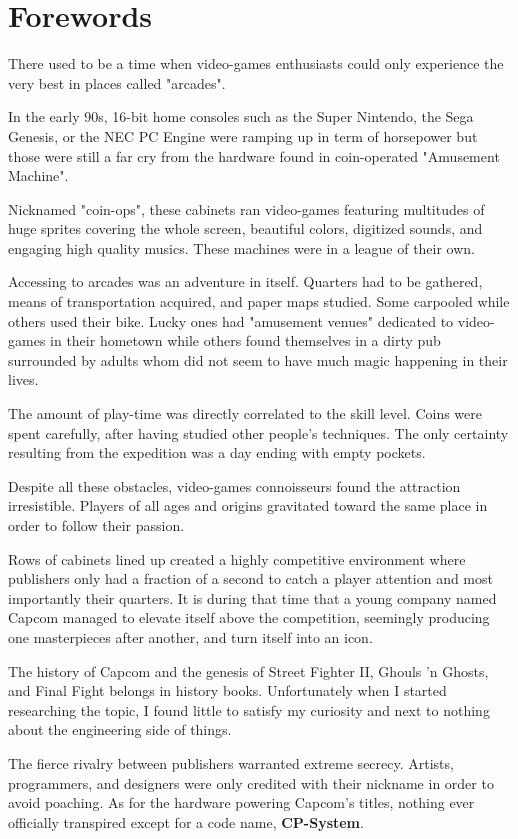 \chapter*{Forewords}

There used to be a time when video-games enthusiasts could only experience the very best in places called "arcades". 

In the early 90s, 16-bit home consoles such as the Super Nintendo, the Sega Genesis, or the NEC PC Engine were ramping up in term of horsepower but those were still a far cry from the hardware found in coin-operated "Amusement Machine".

Nicknamed "coin-ops", these cabinets ran video-games featuring multitudes of huge sprites covering the whole screen, beautiful colors, digitized sounds, and engaging high quality musics. These machines were in a league of their own.

Accessing to arcades was an adventure in itself. Quarters had to be gathered, means of transportation acquired, and paper maps studied. Some carpooled while others used their bike. Lucky ones had "amusement venues" dedicated to video-games in their hometown while others found themselves in a dirty pub surrounded by adults whom did not seem to have much magic happening in their lives. 

The amount of play-time was directly correlated to the skill level. Coins were spent carefully, after having studied other people's techniques. The only certainty resulting from the expedition was a day ending with empty pockets. 

Despite all these obstacles, video-games connoisseurs found the attraction irresistible. Players of all ages and origins gravitated toward the same place in order to follow their passion. 

Rows of cabinets lined up created a highly competitive environment where publishers only had a fraction of a second to catch a player attention and most importantly their quarters. It is during that time that a young company named Capcom  managed to elevate itself above the competition, seemingly producing one masterpieces after another, and turn itself into an icon.

The history of Capcom and the genesis of Street Fighter II, Ghouls 'n Ghosts, and Final Fight belongs in history books. Unfortunately when I started researching the topic, I found little to satisfy my curiosity and next to nothing about the engineering side of things. 

The fierce rivalry between publishers warranted extreme secrecy. Artists, programmers, and designers were only credited with their nickname in order to avoid poaching. As for the hardware powering Capcom's titles, nothing ever officially transpired except for a code name, \textbf{CP-System}.

